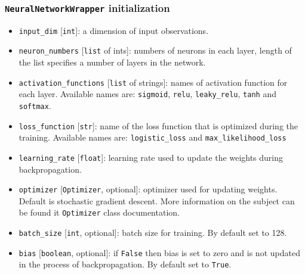 \documentclass[a4]{article}
\begin{document}
\subsubsection{\texttt{NeuralNetworkWrapper} initialization}
\begin{itemize}
\itemsep0em 
	\item \texttt{input\_dim} [\texttt{int}]: a dimension of input observations. 
	\item \texttt{neuron\_numbers} [\texttt{list} of ints]: numbers of neurons in each layer, length of the list specifies a number of layers in the network.
	\item \texttt{activation\_functions} [\texttt{list} of strings]: names of activation function for each layer. Available names are: \texttt{sigmoid}, \texttt{relu}, \texttt{leaky\_relu}, \texttt{tanh} and \texttt{softmax}.
	\item \texttt{loss\_function} [\texttt{str}]: name of the loss function that is optimized during the training. Available names are: \texttt{logistic\_loss} and \texttt{max\_likelihood\_loss}
	\item \texttt{learning\_rate} [\texttt{float}]: learning rate used to update the weights during backpropagation. 
	\item \texttt{optimizer} [\texttt{Optimizer}, optional]: optimizer used for updating weights. Default is stochastic gradient descent. More information on the subject can be found it \texttt{Optimizer} class documentation. 
	\item \texttt{batch\_size} [\texttt{int}, optional]: batch size for training. By default set to 128.
	\item \texttt{bias} [\texttt{boolean}, optional]: if \texttt{False} then bias is set to zero and is not updated in the process of backpropagation. By default set to \texttt{True}.
\end{itemize}

\newpage 
\end{document}
